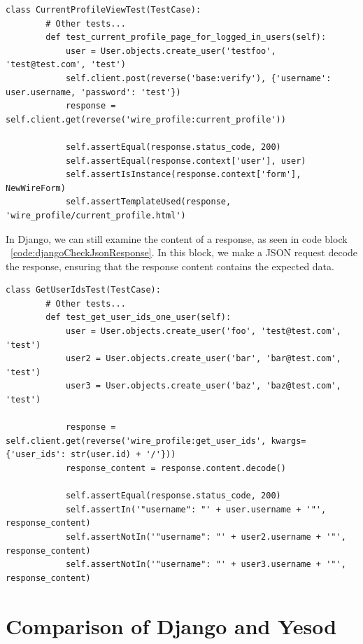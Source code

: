 \begin{lstlisting}[caption={Django current profile test},label={code:djangoCurrentProfileTest}]
    class CurrentProfileViewTest(TestCase):
        # Other tests...
        def test_current_profile_page_for_logged_in_users(self):
            user = User.objects.create_user('testfoo', 'test@test.com', 'test')
            self.client.post(reverse('base:verify'), {'username': user.username, 'password': 'test'})
            response = self.client.get(reverse('wire_profile:current_profile'))

            self.assertEqual(response.status_code, 200)
            self.assertEqual(response.context['user'], user)
            self.assertIsInstance(response.context['form'], NewWireForm)
            self.assertTemplateUsed(response, 'wire_profile/current_profile.html')
\end{lstlisting}

In Django, we can still examine the content of a response, as seen in code block ~\ref{code:djangoCheckJsonResponse}.
In this block, we make a JSON request decode the response, ensuring that the response
content contains the expected data.

\begin{lstlisting}[caption={Django checking a JSON response test},label={code:djangoCheckJsonResponse}]
    class GetUserIdsTest(TestCase):
        # Other tests...
        def test_get_user_ids_one_user(self):
            user = User.objects.create_user('foo', 'test@test.com', 'test')
            user2 = User.objects.create_user('bar', 'bar@test.com', 'test')
            user3 = User.objects.create_user('baz', 'baz@test.com', 'test')

            response = self.client.get(reverse('wire_profile:get_user_ids', kwargs={'user_ids': str(user.id) + '/'}))
            response_content = response.content.decode()

            self.assertEqual(response.status_code, 200)
            self.assertIn('"username": "' + user.username + '"', response_content)
            self.assertNotIn('"username": "' + user2.username + '"', response_content)
            self.assertNotIn('"username": "' + user3.username + '"', response_content)
\end{lstlisting}

\section{Comparison of Django and Yesod}

